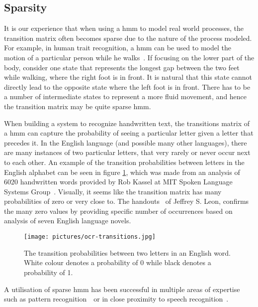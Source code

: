 \subsection{Sparsity}
\label{sec:hmm-and-sparsity}
It is our experience that when using a \gls{hmm} to model real world processes, the transition matrix often becomes sparse due to the nature of the process modeled.
For example, in human trait recognition, a \gls{hmm} can be used to model the motion of a particular person while he walks~\cite{trait-recognition}.
If focusing on the lower part of the body, consider one state that represents the longest gap between the two feet while walking, where the right foot is in front. It is natural that this state cannot directly lead to the opposite state where the left foot is in front. There has to be a number of intermediate states to represent a more fluid movement, and hence the transition matrix may be quite sparse \gls{hmm}.

When building a system to recognize handwritten text, the transitions matrix of a \gls{hmm} can capture the probability of seeing a particular letter given a letter that precedes it.
In the English language (and possible many other languages), there are many instances of two particular letters, that very rarely or never occur next to each other. An example of the transition probabilities between letters in the English alphabet can be seen in figure \ref{fig:ocr-transitions}, which was made from an analysis of 6020 handwritten words provided by Rob Kassel at MIT Spoken Language Systems Group~\cite{thomas-letter-pair-analysis-picture}. Visually, it seems like the transition matrix has many probabilities of zero or very close to. The handouts~\cite{leon-letter-pair-analysis-handouts} of Jeffrey S. Leon, confirms the many zero values by providing specific number of occurrences based on analysis of seven English language novels.

\begin{figure}
	\begin{centering}
		\texttt{[image: pictures/ocr-transitions.jpg]}
		\caption{The transition probabilities between two letters in an English word. White colour denotes a probability of 0 while black denotes a probability of 1.}
		\label{fig:ocr-transitions}
	\end{centering}
\end{figure}

A utilisation of sparse \gls{hmm} has been successful in multiple areas of expertise such as pattern recognition~\cite{bicego2007}~or in close proximity to speech recognition~\cite{roweis1999}.